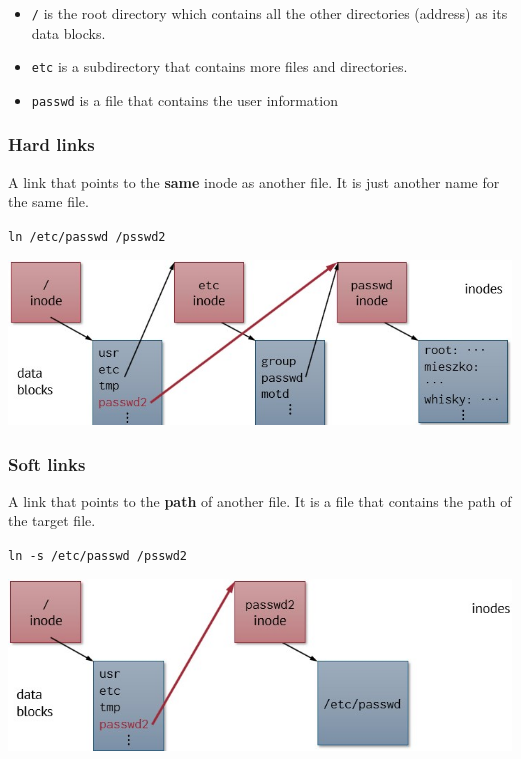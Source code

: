 \documentclass[letterpaper,12pt]{article}
\begin{document}
\begin{itemize}
    \item \texttt{/} is the root directory which contains all the other directories (address) as its data blocks.
    \item \texttt{etc} is a subdirectory that contains more files and directories.
    \item \texttt{passwd} is a file that contains the user information
\end{itemize}

\subsubsection{Hard links}
A link that points to the \textbf{same} inode as another file. It is just another name for the same file. 

\texttt{ln /etc/passwd /psswd2}

\includegraphics*[scale= 0.6]{./Images/Hard links inode.jpg}

\subsubsection{Soft links}
A link that points to the \textbf{path} of another file. It is a file that contains the path of the target file.

\texttt{ln -s /etc/passwd /psswd2}

\includegraphics*[scale= 0.6]{./Images/Soft links inode.jpg}
\end{document}
